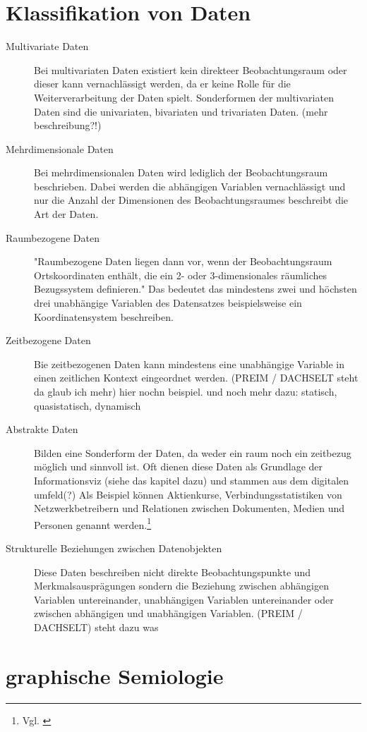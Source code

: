 \documentclass[a4paper, 12pt, onepage, pdftex, headsepline, footsepline]{scrreprt}
\begin{document}
\section{Klassifikation von Daten}
\begin{description}
\item[Multivariate Daten]
Bei multivariaten Daten existiert kein direkteer Beobachtungsraum oder dieser kann vernachlässigt werden, da er
keine Rolle für die Weiterverarbeitung der Daten spielt. Sonderformen der multivariaten Daten sind die univariaten,
bivariaten und trivariaten Daten. (mehr beschreibung?!)
\item[Mehrdimensionale Daten]
Bei mehrdimensionalen Daten wird lediglich der Beobachtungsraum beschrieben. Dabei werden die abhängigen Variablen
vernachlässigt und nur die Anzahl der Dimensionen des Beobachtungsraumes beschreibt die Art der Daten.
\item[Raumbezogene Daten]
"Raumbezogene Daten liegen dann vor, wenn der Beobachtungsraum Ortskoordinaten enthält,
die ein 2- oder 3-dimensionales räumliches Bezugssystem definieren."\citep[S.\,219]{Schumann}
Das bedeutet das mindestens zwei und höchsten drei unabhängige Variablen des Datensatzes beispielsweise
ein Koordinatensystem beschreiben.
\item[Zeitbezogene Daten]
Bie zeitbezogenen Daten kann mindestens eine unabhängige Variable in einen zeitlichen Kontext eingeordnet werden.
(PREIM / DACHSELT steht da glaub ich mehr) hier nochn beispiel.
und noch mehr dazu: statisch, quasistatisch, dynamisch
\item[Abstrakte Daten]
Bilden eine Sonderform der Daten, da weder ein raum noch ein zeitbezug möglich und sinnvoll ist. Oft dienen diese
Daten als Grundlage der Informationsviz (siehe das kapitel dazu) und stammen aus dem digitalen umfeld(?)
Als Beispiel können Aktienkurse, Verbindungsstatistiken von Netzwerkbetreibern und Relationen zwischen
Dokumenten, Medien und Personen genannt werden.\footnote{Vgl. \citep{Preim}}
\item[Strukturelle Beziehungen zwischen Datenobjekten]
Diese Daten beschreiben nicht direkte Beobachtungspunkte und Merkmalsausprägungen sondern die Beziehung zwischen
abhängigen Variablen untereinander, unabhängigen Variablen untereinander oder zwischen abhängigen und unabhängigen
Variablen.
(PREIM / DACHSELT) steht dazu was
\end{description}

\section{graphische Semiologie}
\end{document}
